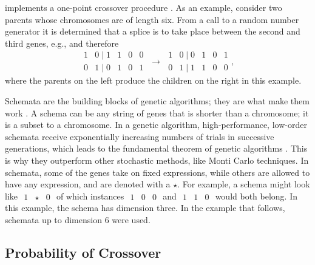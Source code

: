 \documentclass[twocolumn,twoside,fleqn,12pt]{article}
\renewcommand{\normalfont}{\usefont{T1}{txr}{m}{n}}
\newcommand{\fonttt}[1]{\usefont{T1}{txtt}{m}{n}{#1}\normalfont}
\renewcommand{\texttt}[1]{\fonttt{#1}\xspace}
\newcommand{\eg}{e.g.,\xspace}
\begin{document}
\texttt{Crossover} implements a one-point crossover procedure
\cite{SivanandamDeepa08}.  As an example, consider two parents whose
chromosomes are of length six.  From a call to a random number generator
it is determined that a splice is to take place between the second
and third genes, \eg and therefore
\begin{displaymath}
    \begin{array}{ccccc}
        1 & 0 \; | \; 1 & 1 & 0 & 0 \\
        0 & 1 \; | \; 0 & 1 & 0 & 1
    \end{array}
    \; \longrightarrow \;
    \begin{array}{ccccc}
        1 & 0 \; | \; 0 & 1 & 0 & 1 \\
        0 & 1 \; | \; 1 & 1 & 0 & 0
    \end{array} ,
\end{displaymath}
where the parents on the left produce the children on the right in
this example.

Schemata are the building blocks of genetic algorithms; they are what make
them work \cite{Goldberg89,Goldberg02}.  A schema can be any string of genes
that is shorter than a chromosome; it is a subset to a chromosome.  In a
genetic algorithm, high-performance, low-order schemata receive exponentially
increasing numbers of trials in successive generations, which leads to the
fundamental theorem of genetic algorithms \cite{Goldberg89,SivanandamDeepa08}.
This is why they outperform other stochastic methods, like Monti Carlo
techniques.  In schemata, some of the genes take
on fixed expressions, while others are allowed to have any expression,
and are denoted with a $\star$.  For example, a schema might
look like $\begin{array}{ccc} 1 & \star & 0 \end{array}$ of which
instances $\begin{array}{ccc} 1 & 0 & 0 \end{array}$ and
$\begin{array}{ccc} 1 & 1 & 0 \end{array}$ would both belong.  In this
example, the schema has dimension three.  In the example that
follows, schemata up to dimension 6 were used.


\subsection{Probability of Crossover}
\end{document}
